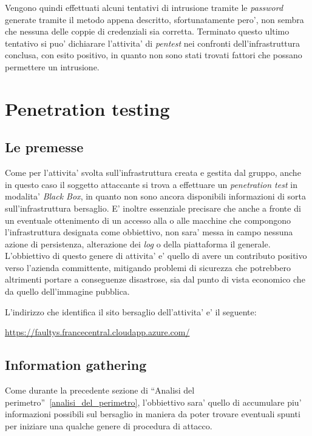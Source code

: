 \documentclass[a4paper]{report}
\newcommand{\quotes}[1]{``#1''}
\begin{document}
				Vengono quindi effettuati alcuni tentativi di intrusione tramite le \emph{password} generate tramite il
				metodo appena descritto, sfortunatamente pero', non sembra che nessuna delle coppie di credenziali sia
				corretta. Terminato questo ultimo tentativo si puo' dichiarare l'attivita' di \emph{pentest} nei
				confronti dell'infrastruttura conclusa, con esito positivo, in quanto non sono stati trovati fattori che
				possano permettere un intrusione.

\chapter{Penetration testing}\label{penetration_testing}
	\section{Le premesse}\label{le_premesse}
		Come per l'attivita' svolta sull'infrastruttura creata e gestita dal gruppo, anche in questo caso il soggetto
		attaccante si trova a effettuare un \emph{penetration test} in modalita' \emph{Black Box}, in quanto non sono
		ancora disponibili informazioni di sorta sull'infrastruttura bersaglio. E' inoltre essenziale precisare che
		anche a fronte di un eventuale ottenimento di un accesso alla o alle macchine che compongono l'infrastruttura
		designata come obbiettivo, non sara' messa in campo nessuna azione di persistenza, alterazione dei \emph{log} o
		della piattaforma il generale. L'obbiettivo di questo genere di attivita' e' quello di avere un contributo
		positivo verso l'azienda committente, mitigando problemi di sicurezza che potrebbero altrimenti portare a
		conseguenze disastrose, sia dal punto di vista economico che da quello dell'immagine pubblica.

		L'indirizzo che identifica il sito bersaglio dell'attivita' e' il seguente:

		\href{https://faultys.francecentral.cloudapp.azure.com/}{https://faultys.francecentral.cloudapp.azure.com/}
	\section{Information gathering}\label{information_gathering}
		Come durante la precedente sezione di \quotes{Analisi del perimetro}~\ref{analisi_del_perimetro}, l'obbiettivo
		sara' quello di accumulare piu' informazioni possibili sul bersaglio in maniera da poter trovare eventuali
		spunti per iniziare una qualche genere di procedura di attacco.
\end{document}
